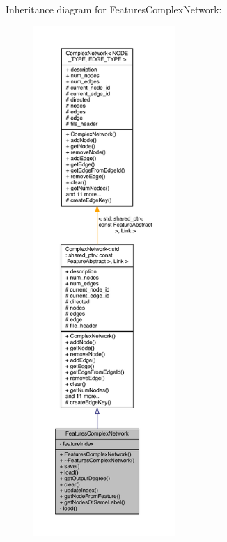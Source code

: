 Inheritance diagram for Features\+Complex\+Network\+:\nopagebreak
\begin{figure}[H]
\begin{center}
\leavevmode
\includegraphics[height=550pt]{class_features_complex_network__inherit__graph}
\end{center}
\end{figure}


